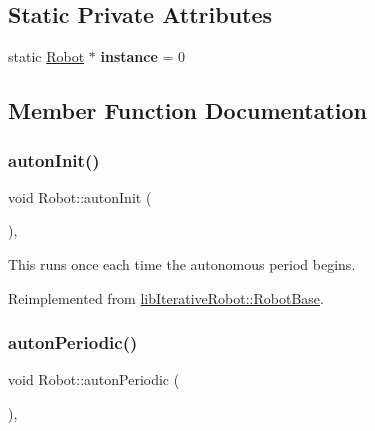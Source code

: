 \subsection*{Static Private Attributes}
\begin{DoxyCompactItemize}
\item 
\mbox{\label{class_robot_aad5c5d6db601aac62393d47ec9385fa3}} 
static \mbox{\hyperlink{class_robot}{Robot}} $\ast$ {\bfseries instance} = 0
\end{DoxyCompactItemize}


\subsection{Member Function Documentation}
\mbox{\label{class_robot_af5bd4d345ec522b70bdc5cf2b17ffa49}} 
\subsubsection{\texorpdfstring{autonInit()}{autonInit()}}
{\footnotesize\ttfamily void Robot\+::auton\+Init (\begin{DoxyParamCaption}{ }\end{DoxyParamCaption})\hspace{0.3cm}{\ttfamily [protected]}, {\ttfamily [virtual]}}

This runs once each time the autonomous period begins. 

Reimplemented from \mbox{\hyperlink{classlib_iterative_robot_1_1_robot_base_a8137d84aef11ed00a46cbc1bbb727a60}{lib\+Iterative\+Robot\+::\+Robot\+Base}}.

\mbox{\label{class_robot_a51cab9afb43b369593ca189101b25b26}} 
\subsubsection{\texorpdfstring{autonPeriodic()}{autonPeriodic()}}
{\footnotesize\ttfamily void Robot\+::auton\+Periodic (\begin{DoxyParamCaption}{ }\end{DoxyParamCaption})\hspace{0.3cm}{\ttfamily [protected]}, {\ttfamily [virtual]}}

